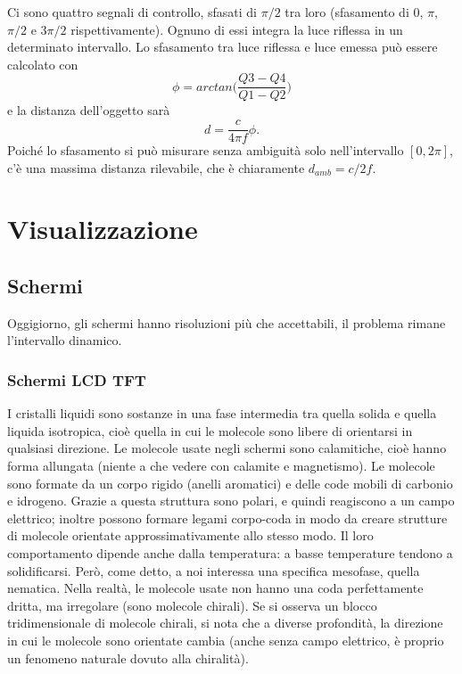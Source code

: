 \documentclass[a4paper,11pt]{article}
\begin{document}
\par
Ci sono quattro segnali di controllo, sfasati di $\pi / 2$ tra loro (sfasamento di 0, $\pi$, $\pi/2$ e $3\pi/2$ rispettivamente). Ognuno di essi integra la luce riflessa in un determinato intervallo.
Lo sfasamento tra luce riflessa e luce emessa può essere calcolato con
\[
\phi = arctan\Bigg(\frac{Q3-Q4}{Q1-Q2}\Bigg)
\]
e la distanza dell'oggetto sarà
\[
d = \frac{c}{4 \pi f} \phi.
\]
Poiché lo sfasamento si può misurare senza ambiguità solo nell'intervallo $[0, 2\pi]$, c'è una massima distanza rilevabile, che è chiaramente $d_{amb} = c/2f$.

\newpage

\section{Visualizzazione}
\subsection{Schermi}
Oggigiorno, gli schermi hanno risoluzioni più che accettabili, il problema rimane l'intervallo dinamico.

\subsubsection{Schermi LCD TFT}
I cristalli liquidi sono sostanze in una fase intermedia tra quella solida e quella liquida isotropica,
cioè quella in cui le molecole sono libere di orientarsi in qualsiasi direzione. Le molecole usate negli schermi sono calamitiche, cioè hanno forma allungata
(niente a che vedere con calamite e magnetismo). Le molecole sono formate da un corpo rigido (anelli aromatici) e delle code
mobili di carbonio e idrogeno. Grazie a questa struttura sono polari, e quindi reagiscono a un campo elettrico; inoltre
possono formare legami corpo-coda in modo da creare strutture di molecole orientate approssimativamente allo stesso modo.
Il loro comportamento dipende anche dalla temperatura: a basse temperature tendono a solidificarsi. Però, come detto,
a noi interessa una specifica mesofase, quella nematica. Nella realtà, le molecole usate non hanno una coda perfettamente
dritta, ma irregolare (sono molecole chirali). Se si osserva un blocco tridimensionale di molecole chirali,
si nota che a diverse profondità, la direzione in cui le molecole sono orientate cambia (anche senza campo elettrico, è proprio un fenomeno naturale dovuto alla chiralità).
\end{document}
